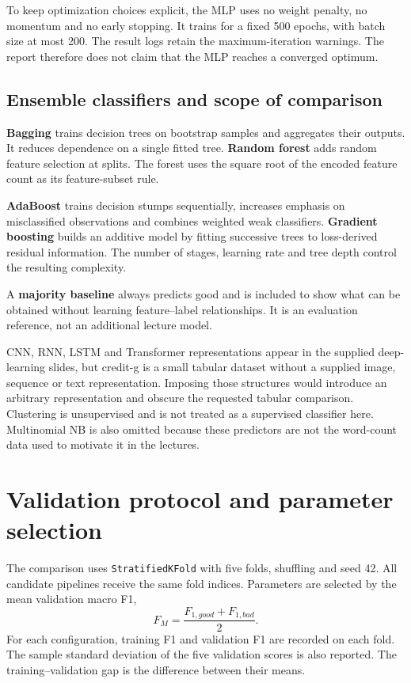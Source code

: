 To keep optimization choices explicit, the MLP uses no weight penalty, no momentum and no early stopping. It trains for a fixed 500 epochs, with batch size at most 200. The result logs retain the maximum-iteration warnings. The report therefore does not claim that the MLP reaches a converged optimum.


\subsection{Ensemble classifiers and scope of comparison}
\textbf{Bagging} trains decision trees on bootstrap samples and aggregates their outputs. It reduces dependence on a single fitted tree. \textbf{Random forest} adds random feature selection at splits. The forest uses the square root of the encoded feature count as its feature-subset rule.

\textbf{AdaBoost} trains decision stumps sequentially, increases emphasis on misclassified observations and combines weighted weak classifiers. \textbf{Gradient boosting} builds an additive model by fitting successive trees to loss-derived residual information. The number of stages, learning rate and tree depth control the resulting complexity.

A \textbf{majority baseline} always predicts good and is included to show what can be obtained without learning feature--label relationships. It is an evaluation reference, not an additional lecture model.

CNN, RNN, LSTM and Transformer representations appear in the supplied deep-learning slides, but credit-g is a small tabular dataset without a supplied image, sequence or text representation. Imposing those structures would introduce an arbitrary representation and obscure the requested tabular comparison. Clustering is unsupervised and is not treated as a supervised classifier here. Multinomial NB is also omitted because these predictors are not the word-count data used to motivate it in the lectures.


\section{Validation protocol and parameter selection}
The comparison uses \texttt{StratifiedKFold} with five folds, shuffling and seed 42. All candidate pipelines receive the same fold indices. Parameters are selected by the mean validation macro F1,
\[
F_M=\frac{F_{1,good}+F_{1,bad}}2.
\]
For each configuration, training F1 and validation F1 are recorded on each fold. The sample standard deviation of the five validation scores is also reported. The training--validation gap is the difference between their means.

